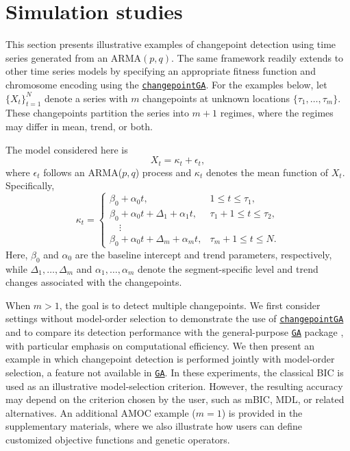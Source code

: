\section{Simulation studies}\label{simulation-studies}

This section presents illustrative examples of changepoint detection using time series generated from an ARMA\((p,q)\). The same framework readily extends to other time series models by specifying an appropriate fitness function and chromosome encoding using the \href{https://CRAN.R-project.org/package=changepointGA}{\texttt{changepointGA}}. For the examples below, let \(\{X_t\}_{t=1}^{N}\) denote a series with \(m\) changepoints at unknown locations \(\{\tau_{1}, \ldots, \tau_{m}\}\). These changepoints partition the series into \(m+1\) regimes, where the regimes may differ in mean, trend, or both.

The model considered here is
\begin{equation}
    X_t = \kappa_t + \epsilon_t, 
    \label{eq:timeseriesmodel}
\end{equation}
where \(\epsilon_t\) follows an ARMA(\(p,q\)) process and \(\kappa_t\) denotes the mean function of \(X_t\). Specifically,
\begin{equation}
    \kappa_t =
    \begin{cases}
        \beta_0 + \alpha_0 t, 
        & 1 \leq t \leq \tau_1, \\
        \beta_0 + \alpha_0 t + \Delta_1 + \alpha_1 t, 
        & \tau_1 + 1 \leq t \leq \tau_2, \\
        \quad \vdots \\
        \beta_0 + \alpha_0 t + \Delta_m + \alpha_m t, 
        & \tau_m + 1 \leq t \leq N.
    \end{cases}
    \label{eq:kappa}
\end{equation}
Here, \(\beta_0\) and \(\alpha_0\) are the baseline intercept and trend parameters, respectively, while \(\Delta_1,\ldots,\Delta_m\) and \(\alpha_1,\ldots,\alpha_m\) denote the segment-specific level and trend changes associated with the changepoints.

When \(m>1\), the goal is to detect multiple changepoints. We first consider settings without model-order selection to demonstrate the use of \href{https://CRAN.R-project.org/package=changepointGA}{\texttt{changepointGA}} and to compare its detection performance with the general-purpose \href{https://CRAN.R-project.org/package=GA}{\texttt{GA}} package \citep{scrucca2013ga}, with particular emphasis on computational efficiency. We then present an example in which changepoint detection is performed jointly with model-order selection, a feature not available in \href{https://CRAN.R-project.org/package=GA}{\texttt{GA}}. In these experiments, the classical BIC is used as an illustrative model-selection criterion. However, the resulting accuracy may depend on the criterion chosen by the user, such as mBIC, MDL, or related alternatives. An additional AMOC example (\(m=1\)) is provided in the supplementary materials, where we also illustrate how users can define customized objective functions and genetic operators.

